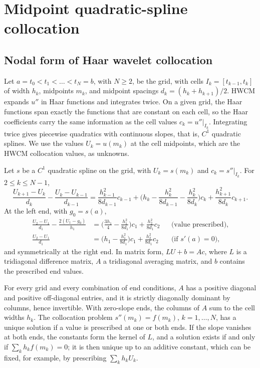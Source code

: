 \documentclass[smallextended,envcountsame]{svjour3}
\begin{document}
\section{Midpoint quadratic-spline collocation}\label{sec:method}
\subsection{Nodal form of Haar wavelet collocation}
Let $a=t_0<t_1<\dots<t_N=b$, with $N\ge2$, be the grid, with cells $I_k=[t_{k-1},t_k]$ of width $h_k$,
midpoints $m_k$, and midpoint spacings $d_k=(h_k+h_{k+1})/2$. HWCM expands $u''$ in Haar functions and
integrates twice. On a given grid, the Haar functions span exactly the functions that are constant on each
cell, so the Haar coefficients carry the same information as the cell values $c_k=u''|_{I_k}$.
Integrating twice gives piecewise quadratics with continuous slopes, that is, $C^1$ quadratic splines.
We use the values $U_k=u(m_k)$ at the cell midpoints, which are the HWCM collocation values, as unknowns.

\begin{theorem}\label{thm:identity}
Let $s$ be a $C^1$ quadratic spline on the grid, with $U_k=s(m_k)$ and $c_k=s''|_{I_k}$. For $2\le k\le N-1$,
\begin{equation}\label{eq:interior}
\frac{U_{k+1}-U_k}{d_k}-\frac{U_k-U_{k-1}}{d_{k-1}}
=\frac{h_{k-1}^2}{8d_{k-1}}c_{k-1}+\Big(h_k-\frac{h_k^2}{8d_{k-1}}-\frac{h_k^2}{8d_k}\Big)c_k+\frac{h_{k+1}^2}{8d_k}c_{k+1}.
\end{equation}
At the left end, with $g_0=s(a)$,
\begin{align}
\frac{U_2-U_1}{d_1}-\frac{2(U_1-g_0)}{h_1}&=\Big(\frac{3h_1}{4}-\frac{h_1^2}{8d_1}\Big)c_1+\frac{h_2^2}{8d_1}c_2 &&\text{(value prescribed)},\label{eq:dirrow}\\
\frac{U_2-U_1}{d_1}&=\Big(h_1-\frac{h_1^2}{8d_1}\Big)c_1+\frac{h_2^2}{8d_1}c_2 &&\text{(if } s'(a)=0),\label{eq:neurow}
\end{align}
and symmetrically at the right end. In matrix form, $LU+b=Ac$, where $L$ is a tridiagonal difference
matrix, $A$ a tridiagonal averaging matrix, and $b$ contains the prescribed end values.
\end{theorem}

\begin{corollary}\label{cor:ops}
For every grid and every combination of end conditions, $A$ has a positive diagonal and positive
off-diagonal entries, and it is strictly diagonally dominant by columns, hence invertible. With zero-slope ends, the columns of $A$
sum to the cell widths $h_k$. The collocation problem $s''(m_k)=f(m_k)$, $k=1,\dots,N$, has a
unique solution if a value is prescribed at one or both ends. If the slope vanishes at both ends, the
constants form the kernel of $L$, and a solution exists if and only if $\sum_kh_kf(m_k)=0$; it is then
unique up to an additive constant, which can be fixed, for example, by prescribing $\sum_kh_kU_k$.
\end{corollary}
\end{document}
